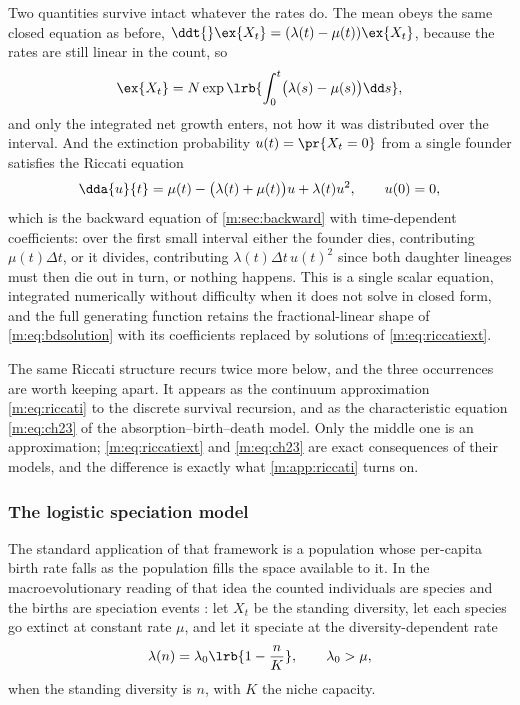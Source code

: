 Two quantities survive intact whatever the rates do. The mean obeys the same
closed equation as before, $\ddt{}\ex{X_t}=(\lambda(t)-\mu(t))\ex{X_t}$, because
the rates are still linear in the count, so
\begin{equation}
\label{m:eq:meanodeinhom}
\ex{X_t} = N\exp\lrb{\int_0^t\bigl(\lambda(s)-\mu(s)\bigr)\dd s} ,
\end{equation}
and only the integrated net growth enters, not how it was distributed over the
interval. And the extinction probability $u(t)=\pr{X_t=0}$ from a single founder
satisfies the Riccati equation
\begin{equation}
\label{m:eq:riccatiext}
\dda{u}{t} = \mu(t)-\bigl(\lambda(t)+\mu(t)\bigr)u+\lambda(t)u^2,
\qquad u(0)=0 ,
\end{equation}
which is the backward equation of \cref{m:sec:backward} with time-dependent
coefficients: over the first small interval either the founder dies, contributing
$\mu(t)\Delta t$, or it divides, contributing $\lambda(t)\Delta t\,u(t)^2$ since
both daughter lineages must then die out in turn, or nothing happens. This is a
single scalar equation, integrated numerically without difficulty when it does
not solve in closed form, and the full generating function retains the
fractional-linear shape of \cref{m:eq:bdsolution} with its coefficients replaced
by solutions of \cref{m:eq:riccatiext}.

The same Riccati structure recurs twice more below, and the three occurrences are
worth keeping apart. It appears as the continuum approximation
\cref{m:eq:riccati} to the discrete survival recursion, and as the characteristic
equation \cref{m:eq:ch23} of the absorption--birth--death model. Only the middle
one is an approximation; \cref{m:eq:riccatiext} and \cref{m:eq:ch23} are exact
consequences of their models, and the difference is exactly what
\cref{m:app:riccati} turns on.

\subsubsection{The logistic speciation model}
\label{m:sec:logisticspeciation}

The standard application of that framework is a population whose per-capita birth
rate falls as the population fills the space available to it. In the macroevolutionary
reading of that idea the counted individuals are species and the births are
speciation events \cite{Allen2010}: let $X_t$ be the standing diversity, let each
species go extinct at constant rate $\mu$, and let it speciate at the
diversity-dependent rate
\begin{equation}
\label{m:eq:speciationrate}
\lambda(n) = \lambda_0\lrb{1-\frac{n}{K}},
\qquad \lambda_0>\mu ,
\end{equation}
when the standing diversity is $n$, with $K$ the niche capacity.

